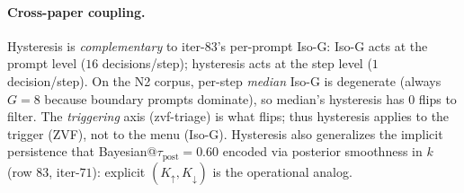 \documentclass{article}
\begin{document}
\paragraph{Cross-paper coupling.}
Hysteresis is \emph{complementary} to iter-83's per-prompt
Iso-G: Iso-G acts at the prompt level ($16$ decisions/step);
hysteresis acts at the step level ($1$ decision/step).
On the N2 corpus, per-step \emph{median} Iso-G is degenerate
(always $G = 8$ because boundary prompts dominate), so
median's hysteresis has $0$ flips to filter.  The
\emph{triggering} axis (zvf-triage) is what flips; thus
hysteresis applies to the trigger (ZVF), not to the menu (Iso-G).
Hysteresis also generalizes the implicit persistence that
Bayesian@$\tau_{\mathrm{post}}{=}0.60$ encoded via posterior
smoothness in $k$ (row $83$, iter-$71$): explicit
$(K_{\uparrow}, K_{\downarrow})$ is the operational analog.
\end{document}
